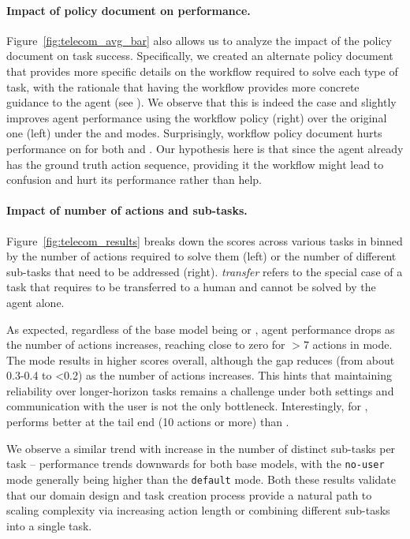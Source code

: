 \paragraph{Impact of policy document on performance.}
Figure~\ref{fig:telecom_avg_bar} also allows us to analyze the impact of the policy document on task success. Specifically, we created an alternate policy document that provides more specific details on the workflow required to solve each type of task, with the rationale that having the workflow provides more concrete guidance to the agent (see ). We observe that this is indeed the case and slightly improves agent performance using the workflow policy (right) over the original one (left) under the \basemode and \solomode modes. Surprisingly, workflow policy document hurts performance on \gtmode for both \gptmodelshort and \ofourmodelshort. Our hypothesis here is that since the agent already has the ground truth action sequence, providing it the workflow might lead to confusion and hurt its performance rather than help.
 
\paragraph{Impact of number of actions and sub-tasks.}



Figure~\ref{fig:telecom_results} breaks down the \passone  scores across various tasks in \telecom binned by the number of actions required to solve them (left) or the number of different sub-tasks that need to be addressed (right). \textit{transfer} refers to the special case of a task that requires to be transferred to a human and cannot be solved by the agent alone. 

As expected, regardless of the base model being \gptmodelshort or \ofourmodelshort, agent performance drops as the number of actions increases, reaching close to zero for $>7$ actions in \basemode mode. The \solomode mode results in higher scores overall, although the gap reduces (from about 0.3-0.4 to <0.2) as the number of actions increases. This hints that maintaining reliability over longer-horizon tasks remains a challenge under both settings and communication with the user is not the only bottleneck. Interestingly, for \solomode, \gptmodelshort performs better at the tail end (10 actions or more) than \ofourmodelshort.

We observe a similar trend with increase in the number of distinct sub-tasks per task -- performance trends downwards for both base models, with the \texttt{no-user} mode generally being higher than the \texttt{default} mode. Both these results validate that our domain design and task creation process provide a natural path to scaling complexity via increasing action length or combining different sub-tasks into a single task.


